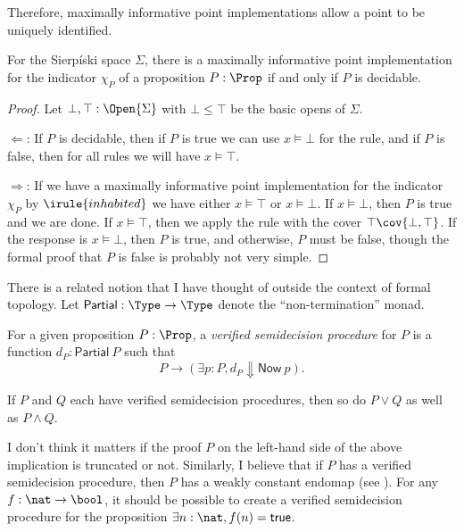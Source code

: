Therefore, maximally informative point implementations allow a point to be uniquely identified.
\begin{theorem}
For the Sierpíski space $\Sigma$, there is a maximally informative point implementation for the indicator $\chi_P$ of a proposition $P : \Prop$ if and only if $P$ is decidable.
\end{theorem}
\begin{proof}
Let $\bot, \top : \Open{\Sigma}$ with $\bot \le \top$ be the basic opens of $\Sigma$. 

$\Longleftarrow$: If $P$ is decidable, then if $P$ is true we can use $x \models \bot$ for the  rule, and if $P$ is false, then for all rules we will have $x \models \top$.

$\Longrightarrow$: If we have a maximally informative point implementation for the indicator $\chi_P$ by $\irule{inhabited}$ we have either $x \models \top$ or $x \models \bot$. If $x \models \bot$, then $P$ is true and we are done. If $x \models \top$, then we apply the  rule with the cover $\top \cov \{ \bot, \top \}$. If the response is $x \models \bot$, then $P$ is true, and otherwise, $P$ must be false, though the formal proof that $P$ is false is probably not very simple.
\end{proof}

There is a related notion that I have thought of outside the context of formal topology. Let $\mathsf{Partial} : \Type \to \Type$ denote the ``non-termination'' monad. 
\begin{definition}
For a given proposition $P : \Prop$, a \emph{verified semidecision procedure} for $P$ is a function $d_P : \mathsf{Partial}\ P$ such that
\[
P \to (\exists p : P, d_P \Downarrow \mathsf{Now}\ p).
\]
\end{definition}

\begin{claim}
If $P$ and $Q$ each have verified semidecision procedures, then so do $P \vee Q$ as well as $P \wedge Q$.
\end{claim}

I don't think it matters if the proof $P$ on the left-hand side of the above implication is truncated or not. Similarly, I believe that if $P$ has a verified semidecision procedure, then $P$ has a weakly constant endomap (see \cite{kraus2014}). For any $f : \nat \to \bool$, it should be possible to create a verified semidecision procedure for the proposition $\exists n : \nat, f(n) = \mathsf{true}$.

